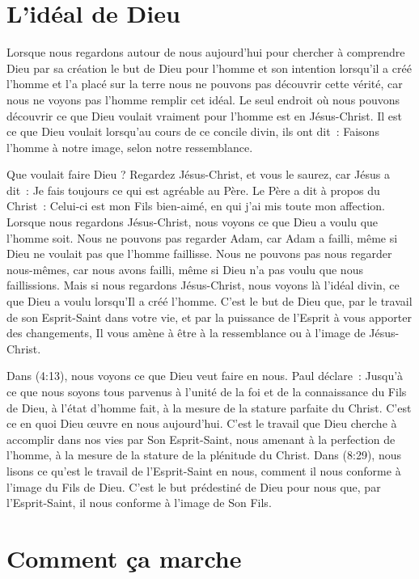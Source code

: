 \section*{L'idéal de Dieu}

Lorsque nous regardons autour de nous aujourd'hui pour chercher
 à comprendre Dieu par sa création
 \ocadr le but de Dieu pour l'homme et son intention
 lorsqu'il a créé l'homme et l'a placé sur la terre \fcadr{}
 nous ne pouvons pas découvrir cette vérité,
 car nous ne voyons pas l'homme remplir cet idéal.
 Le seul endroit où nous pouvons découvrir ce que Dieu voulait vraiment
 pour l'homme est en Jésus-Christ.
 Il est ce que Dieu voulait lorsqu'au cours de ce concile divin, ils ont dit~:
 \og Faisons l'homme à notre image, selon notre ressemblance. \fg{}

Que voulait faire Dieu ?
 Regardez Jésus-Christ, et vous le saurez, car Jésus a dit~:
 \og Je fais toujours ce qui est agréable au Père. \fg{}
 Le Père a dit à propos du Christ~:
 \og Celui-ci est mon Fils bien-aimé, en qui j'ai mis toute mon affection. \fg{}
 Lorsque nous regardons Jésus-Christ,
 nous voyons ce que Dieu a voulu que l'homme soit.
 Nous ne pouvons pas regarder Adam, car Adam a failli,
 même si Dieu ne voulait pas que l'homme faillisse.
 Nous ne pouvons pas nous regarder nous-mêmes,
 car nous avons failli, même si Dieu n'a pas voulu que nous faillissions.
 Mais si nous regardons Jésus-Christ, nous voyons là l'idéal divin,
 ce que Dieu a voulu lorsqu'Il a créé l'homme.
 C'est le but de Dieu que, par le travail de son Esprit-Saint dans votre vie,
 et par la puissance de l'Esprit à vous apporter des changements,
 Il vous amène à être à la ressemblance ou à l'image de Jésus-Christ.

Dans (4:13), nous voyons ce que Dieu veut faire en nous.
 Paul déclare~:
 \og Jusqu'à ce que nous soyons tous parvenus à l'unité de la foi
 et de la connaissance du Fils de Dieu, à l'état d'homme fait,
 à la mesure de la stature parfaite du Christ. \fg{}
 C'est ce en quoi Dieu œuvre en nous aujourd'hui.
 C'est le travail que Dieu cherche à accomplir dans nos vies
 par Son Esprit-Saint, nous amenant à la perfection de l'homme,
 à la mesure de la stature de la plénitude du Christ.
 Dans (8:29), nous lisons
 ce qu'est le travail de l'Esprit-Saint en nous,
 comment il nous conforme à l'image du Fils de Dieu.
 C'est le but prédestiné de Dieu pour nous
 que, par l'Esprit-Saint, il nous conforme à l'image de Son Fils.


\section*{Comment ça marche}

